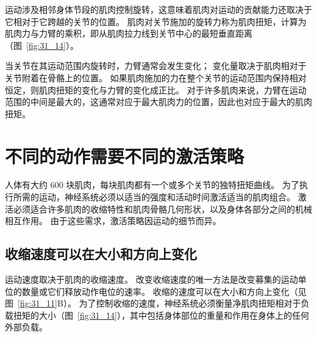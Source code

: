 运动涉及相邻身体节段的肌肉控制旋转，这意味着肌肉对运动的贡献能力还取决于它相对于它跨越的关节的位置。
肌肉对关节施加的旋转力称为肌肉扭矩，计算为肌肉力与力臂的乘积，即从肌肉拉力线到关节中心的最短垂直距离（图~\ref{fig:31_14}）。


当关节在其运动范围内旋转时，力臂通常会发生变化；
变化量取决于肌肉相对于关节附着在骨骼上的位置。
如果肌肉施加的力在整个关节的运动范围内保持相对恒定，则肌肉扭矩的变化与力臂的变化成正比。
对于许多肌肉来说，力臂在运动范围的中间是最大的，这通常对应于最大肌肉力的位置，因此也对应于最大的肌肉扭矩。



\section{不同的动作需要不同的激活策略}

人体有大约 600 块肌肉，每块肌肉都有一个或多个关节的独特扭矩曲线。
为了执行所需的运动，神经系统必须以适当的强度和活动时间激活适当的肌肉组合。
激活必须适合许多肌肉的收缩特性和肌肉骨骼几何形状，以及身体各部分之间的机械相互作用。
由于这些需求，激活策略因运动的细节而异。



\subsection{收缩速度可以在大小和方向上变化}

运动速度取决于肌肉的收缩速度。
改变收缩速度的唯一方法是改变募集的运动单位的数量或它们释放动作电位的速率。
收缩的速度可以在大小和方向上变化（见图~\ref{fig:31_11}B）。
为了控制收缩的速度，神经系统必须衡量净肌肉扭矩相对于负载扭矩的大小（图~\ref{fig:31_14}），其中包括身体部位的重量和作用在身体上的任何外部负载。


